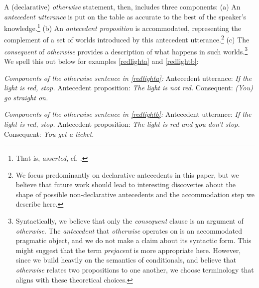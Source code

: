 A (declarative) \textit{otherwise} statement, then, includes three components: (a) An \textit{antecedent utterance} is put on the table as accurate to the best of the speaker's knowledge.\footnote{That is, \textit{asserted}, cf. \citealt{Stalnaker1979}.} (b) An \textit{antecedent proposition} is accommodated, representing the complement of a set of worlds introduced by this antecedent utterance.\footnote{We focus predominantly on declarative antecedents in this paper, but we believe that future work should lead to interesting discoveries about the shape of possible non-declarative antecedents and the accommodation step we describe here.} %
(c) The \textit{consequent} of \textit{otherwise} provides a description of what happens in such worlds.\footnote{Syntactically, we believe that only the \textit{consequent} clause is an argument of \textit{otherwise}. The \textit{antecedent} that \textit{otherwise} operates on is an accommodated pragmatic object, and we do not make a claim about its syntactic form. This might suggest that the term \textit{prejacent} is more appropriate here. However, since we build heavily on the semantics of conditionals, and believe that \textit{otherwise} relates two propositions to one another, we choose terminology that aligns with these theoretical choices.} %
We spell this out below for examples \ref{redlighta} and \ref{redlightb}:

\pex \textit{Components of the \emph{otherwise} sentence in \ref{redlighta}:}
\a  Antecedent utterance: \textit{If the light is red, stop.} \label{components1-a}
\a  Antecedent proposition: \textit{The light is not red.} \label{components1-b}
\a  Consequent: \textit{(You) go straight on.} \label{components1-c}\xe

\pex \textit{Components of the \emph{otherwise} sentence in \ref{redlightb}:}
\a  Antecedent utterance: \textit{If the light is red, stop.} \label{components2-a}
\a  Antecedent proposition: \textit{The light is red and you don't stop.} \label{components2-b}
\a  Consequent: \textit{You get a ticket.} \label{components2-c}\xe

%

